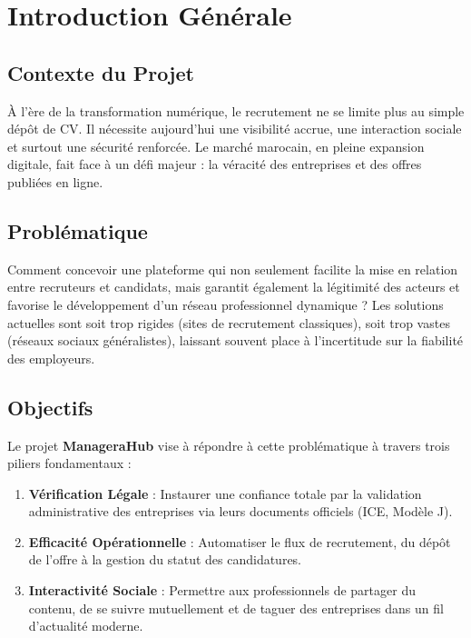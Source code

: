 \documentclass[12pt,a4paper]{report}
\begin{document}
\newpage
{}

\chapter*{Introduction Générale}
\section*{Contexte du Projet}
À l'ère de la transformation numérique, le recrutement ne se limite plus au simple dépôt de CV. Il nécessite aujourd'hui une visibilité accrue, une interaction sociale et surtout une sécurité renforcée. Le marché marocain, en pleine expansion digitale, fait face à un défi majeur : la véracité des entreprises et des offres publiées en ligne.

\section*{Problématique}
Comment concevoir une plateforme qui non seulement facilite la mise en relation entre recruteurs et candidats, mais garantit également la légitimité des acteurs et favorise le développement d'un réseau professionnel dynamique ? Les solutions actuelles sont soit trop rigides (sites de recrutement classiques), soit trop vastes (réseaux sociaux généralistes), laissant souvent place à l'incertitude sur la fiabilité des employeurs.

\section*{Objectifs}
Le projet \textbf{ManageraHub} vise à répondre à cette problématique à travers trois piliers fondamentaux :
\begin{enumerate}
    \item \textbf{Vérification Légale} : Instaurer une confiance totale par la validation administrative des entreprises via leurs documents officiels (ICE, Modèle J).
    \item \textbf{Efficacité Opérationnelle} : Automatiser le flux de recrutement, du dépôt de l'offre à la gestion du statut des candidatures.
    \item \textbf{Interactivité Sociale} : Permettre aux professionnels de partager du contenu, de se suivre mutuellement et de taguer des entreprises dans un fil d'actualité moderne.
\end{enumerate}
\end{document}
